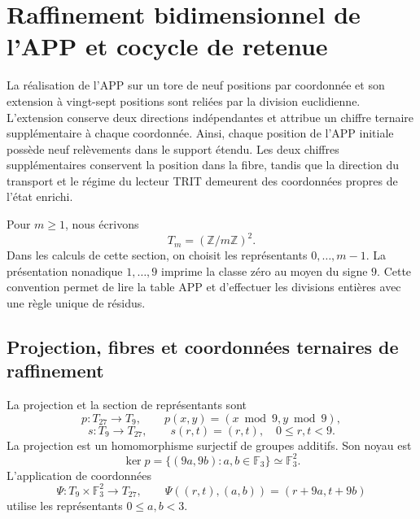 \section{Raffinement bidimensionnel de l'APP et cocycle de retenue}
\label{sec:refinamiento-app-27-9}

La réalisation de l'APP sur un tore de neuf positions par coordonnée
et son extension à vingt-sept positions sont reliées par la division
euclidienne. L'extension conserve deux directions indépendantes et attribue
un chiffre ternaire supplémentaire à chaque coordonnée. Ainsi, chaque position
de l'APP initiale possède neuf relèvements dans le support étendu.
Les deux chiffres supplémentaires conservent la position dans la fibre,
tandis que la direction du transport et le régime du lecteur TRIT
demeurent des coordonnées propres de l'état enrichi.

Pour $m\geq1$, nous écrivons
\[
 T_m=(\mathbb Z/m\mathbb Z)^2.
\]
Dans les calculs de cette section, on choisit les représentants
$0,\ldots,m-1$. La présentation nonadique $1,\ldots,9$ imprime la
classe zéro au moyen du signe $9$. Cette convention permet de lire la table
APP et d'effectuer les divisions entières avec une règle unique de résidus.

\subsection{Projection, fibres et coordonnées ternaires de raffinement}

La projection et la section de représentants sont
\[
 p:T_{27}\longrightarrow T_9,\qquad
 p(x,y)=(x\bmod9,y\bmod9),
\]
\[
 s:T_9\longrightarrow T_{27},\qquad s(r,t)=(r,t),
 \quad 0\leq r,t<9.
\]
La projection est un homomorphisme surjectif de groupes additifs. Son
noyau est
\[
 \ker p=\{(9a,9b):a,b\in\mathbb F_3\}
        \simeq\mathbb F_3^2.
\]
L'application de coordonnées
\begin{equation}
 \Psi:T_9\times\mathbb F_3^2\longrightarrow T_{27},\qquad
 \Psi((r,t),(a,b))=(r+9a,t+9b)
 \label{eq:app-refinamiento-coordenadas}
\end{equation}
utilise les représentants $0\leq a,b<3$.

